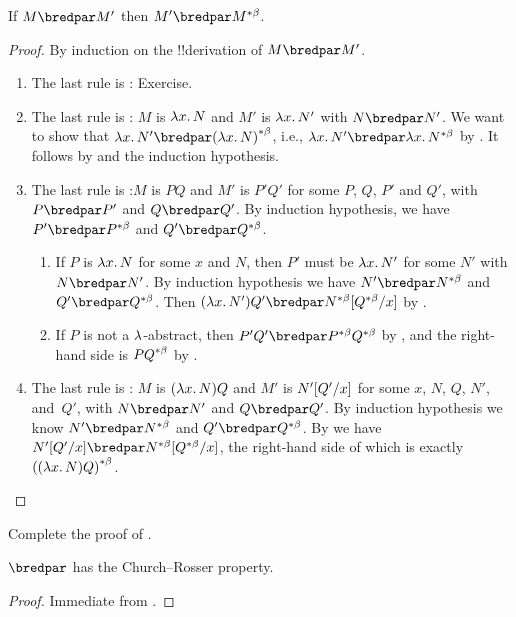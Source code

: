 \documentclass[../../../include/open-logic-section]{subfiles}
\begin{document}
\begin{lem}
  If $M \bredpar M'$ then $M' \bredpar \bcd{M}$.
\end{lem}
\begin{proof}
  By induction on the !!{derivation} of $M \bredpar M'$.
  \begin{enumerate}
    \item The last rule is : Exercise.
    \item The last rule is : $M$ is 
      $\lambd[x][N]$ and $M'$ is $\lambd[x][N']$ with
      $N \bredpar N'$. We want to show that $\lambd[x][N'] \bredpar
      \bcd{(\lambd[x][N])}$, i.e., $\lambd[x][N'] \bredpar
      \lambd[x][\bcd{N}]$ by . It follows by
       and the induction hypothesis.
    \item The last rule is :$M$ is $PQ$ and $M'$
      is $P'Q'$ for some $P$, $Q$, $P'$ and $Q'$, with $P \bredpar P'$
      and $Q \bredpar Q'$. By induction hypothesis, we have $P'
      \bredpar \bcd{P}$ and $Q' \bredpar \bcd{Q}$.
      \begin{enumerate}
        \item If $P$ is $\lambd[x][N]$ for some $x$ and $N$, then
          $P'$ must be $\lambd[x][N']$ for some $N'$ with 
          $N \bredpar N'$. By induction hypothesis we have $N' \bredpar \bcd{N}$ and
          $Q' \bredpar \bcd{Q}$. Then $(\lambd[x][N'])Q' \bredpar
          \Subst{\bcd{N}}{\bcd{Q}}{x}$ by .
        \item If $P$ is not a $\lambd$-abstract, then $P'Q' \bredpar
          \bcd{P}\bcd{Q}$ by , and the right-hand
          side is $\bcd{PQ}$ by .
      \end{enumerate}
    \item The last rule is : $M$ is
      $(\lambd[x][N])Q$  and $M'$ is $N'[Q'/x]$ for some $x$,
      $N$, $Q$, $N'$, and~$Q'$, with $N \bredpar N'$ and $Q \bredpar
      Q'$. By induction hypothesis we know $N' \bredpar \bcd{N}$ and
      $Q' \bredpar \bcd{Q}$. By  we have
      $\Subst{N'}{Q'}{x} \bredpar \Subst{\bcd{N}}{\bcd{Q}}{x}$, the
      right-hand side of which is exactly $\bcd{((\lambd[x][N])Q)}$.
  \end{enumerate}
\end{proof}

\begin{prob}
  Complete the proof of .
\end{prob}

\begin{thm}
  $\bredpar$ has the Church--Rosser property.
\end{thm}

\begin{proof}
  Immediate from .
\end{proof}
\end{document}
